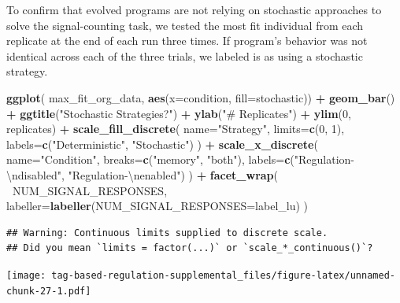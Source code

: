 \documentclass[]{book}
\newenvironment{Shaded}{\begin{snugshade}}{\end{snugshade}}
\newcommand{\CharTok}[1]{\textcolor[rgb]{0.31,0.60,0.02}{#1}}
\newcommand{\DataTypeTok}[1]{\textcolor[rgb]{0.13,0.29,0.53}{#1}}
\newcommand{\DecValTok}[1]{\textcolor[rgb]{0.00,0.00,0.81}{#1}}
\newcommand{\KeywordTok}[1]{\textcolor[rgb]{0.13,0.29,0.53}{\textbf{#1}}}
\newcommand{\NormalTok}[1]{#1}
\newcommand{\OperatorTok}[1]{\textcolor[rgb]{0.81,0.36,0.00}{\textbf{#1}}}
\newcommand{\StringTok}[1]{\textcolor[rgb]{0.31,0.60,0.02}{#1}}
\begin{document}
To confirm that evolved programs are not relying on stochastic approaches to solve the signal-counting task,
we tested the most fit individual from each replicate at the end of each run three times.
If program's behavior was not identical across each of the three trials, we labeled is as using a stochastic strategy.

\begin{Shaded}
\begin{Highlighting}[]
\KeywordTok{ggplot}\NormalTok{( max_fit_org_data, }\KeywordTok{aes}\NormalTok{(}\DataTypeTok{x=}\NormalTok{condition, }\DataTypeTok{fill=}\NormalTok{stochastic)) }\OperatorTok{+}
\StringTok{  }\KeywordTok{geom_bar}\NormalTok{() }\OperatorTok{+}
\StringTok{  }\KeywordTok{ggtitle}\NormalTok{(}\StringTok{"Stochastic Strategies?"}\NormalTok{) }\OperatorTok{+}
\StringTok{  }\KeywordTok{ylab}\NormalTok{(}\StringTok{"# Replicates"}\NormalTok{) }\OperatorTok{+}
\StringTok{  }\KeywordTok{ylim}\NormalTok{(}\DecValTok{0}\NormalTok{, replicates) }\OperatorTok{+}
\StringTok{  }\KeywordTok{scale_fill_discrete}\NormalTok{(}
    \DataTypeTok{name=}\StringTok{"Strategy"}\NormalTok{,}
    \DataTypeTok{limits=}\KeywordTok{c}\NormalTok{(}\DecValTok{0}\NormalTok{, }\DecValTok{1}\NormalTok{),}
    \DataTypeTok{labels=}\KeywordTok{c}\NormalTok{(}\StringTok{"Deterministic"}\NormalTok{, }\StringTok{"Stochastic"}\NormalTok{)}
\NormalTok{  ) }\OperatorTok{+}
\StringTok{  }\KeywordTok{scale_x_discrete}\NormalTok{(}
    \DataTypeTok{name=}\StringTok{"Condition"}\NormalTok{,}
    \DataTypeTok{breaks=}\KeywordTok{c}\NormalTok{(}\StringTok{"memory"}\NormalTok{, }\StringTok{"both"}\NormalTok{),}
    \DataTypeTok{labels=}\KeywordTok{c}\NormalTok{(}\StringTok{"Regulation-}\CharTok{\textbackslash{}n}\StringTok{disabled"}\NormalTok{, }\StringTok{"Regulation-}\CharTok{\textbackslash{}n}\StringTok{enabled"}\NormalTok{)}
\NormalTok{  ) }\OperatorTok{+}
\StringTok{  }\KeywordTok{facet_wrap}\NormalTok{(}
    \OperatorTok{~}\NormalTok{NUM_SIGNAL_RESPONSES,}
    \DataTypeTok{labeller=}\KeywordTok{labeller}\NormalTok{(}\DataTypeTok{NUM_SIGNAL_RESPONSES=}\NormalTok{label_lu)}
\NormalTok{  )}
\end{Highlighting}
\end{Shaded}

\begin{verbatim}
## Warning: Continuous limits supplied to discrete scale.
## Did you mean `limits = factor(...)` or `scale_*_continuous()`?
\end{verbatim}

\texttt{[image: tag-based-regulation-supplemental\_files/figure-latex/unnamed-chunk-27-1.pdf]}
\end{document}
